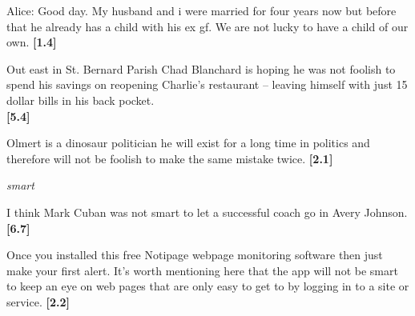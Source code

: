 \documentclass[11pt,fleqn]{article}
\newcommand{\6}{\mbox{$[\hspace*{-.6mm}[$}}
\newcommand{\9}{\mbox{$]\hspace*{-.6mm}]$}}
\begin{document}
\begin{exe}
\begin{xlist}
\ex Alice: Good day. My husband and i were married for four years now but before that he already has a child with his ex gf. We are not lucky to have a child of our own. \hfill {\bf [1.4]}

\end{xlist}



\begin{xlist} \ex Out east in St. Bernard Parish Chad Blanchard is
hoping he was not foolish to spend his savings on reopening
Charlie's restaurant -- leaving himself with just 15 dollar bills in his
back pocket. \\ \hspace*{.1cm} \hfill {\bf [5.4]}


\ex Olmert is a dinosaur politician  he will exist for a long time in politics  and therefore will not be foolish to make the same mistake twice. \hfill {\bf [2.1]}

\end{xlist}

\ex\label{smart} {\em smart}

\begin{xlist}

\ex I think Mark Cuban was not smart to let a successful coach go in Avery Johnson. \hfill {\bf [6.7]}


\ex Once you installed this free Notipage webpage monitoring software
then just make your first alert. It's worth mentioning here that the app
will not be smart to keep an eye on web pages that are only easy
to get to by logging in to a site or service.   \hfill {\bf [2.2]}

\end{xlist}

\end{exe}
\end{document}
